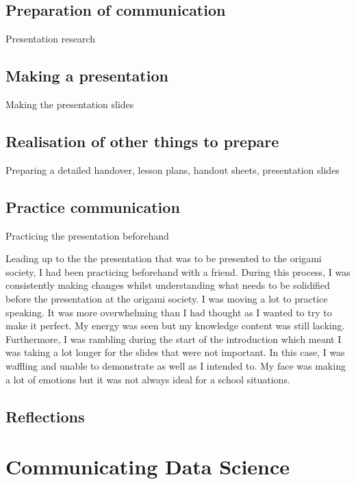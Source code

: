 \documentclass[12pt, a4paper,oneside]{book}
\numberwithin{equation}{section}
\begin{document}
\section{Preparation of communication}\label{sec:x.x}

Presentation research

\section{Making a presentation}\label{sec:x.x}

Making the presentation slides

\section{Realisation of other things to prepare}\label{sec:x.x}

Preparing a detailed handover, lesson plans, handout sheets, presentation slides

\section{Practice communication}\label{sec:x.x}

Practicing the presentation beforehand

Leading up to the the presentation that was to be presented to the origami society, I had been practicing beforehand with a friend. During this process, I was consistently making changes whilst understanding what needs to be solidified before the presentation at the origami society. I was moving a lot to practice speaking. It was more overwhelming than I had thought as I wanted to try to make it perfect. My energy was seen but my knowledge content was still lacking. Furthermore, I was rambling during the start of the introduction which meant I was taking a lot longer for the slides that were not important. In this case, I was waffling and unable to demonstrate as well as I intended to. My face was making a lot of emotions but it was not always ideal for a school situations.

\section{Reflections}\label{sec:x.x}

\chapter{Communicating Data Science}\label{ch:x}
\end{document}
